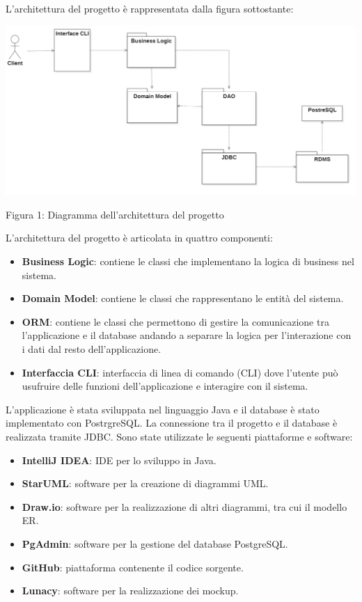 \documentclass[10pt]{article}
\begin{document}
L'architettura del progetto è rappresentata dalla figura sottostante: 
\begin{center}
\hspace*{-1cm}
\includegraphics[scale=0.4]{Sp/Architettura}
\par\medskip
Figura 1: Diagramma dell'architettura del progetto
\par\medskip
\end{center}
L'architettura del progetto è articolata in quattro componenti:
\begin{itemize}
	\item \textbf{Business Logic}: contiene le classi che implementano la logica di business nel sistema.
	\item \textbf{Domain Model}: contiene le classi che rappresentano le entità del sistema.
	\item \textbf{ORM}: contiene le classi che permettono di gestire la comunicazione tra l'applicazione e il database andando a separare la logica per l'interazione con i dati dal resto dell'applicazione.
        \item \textbf{Interfaccia CLI}: interfaccia di linea di comando (CLI) dove l'utente può usufruire delle funzioni dell'applicazione e interagire con il sistema.
\end{itemize}
L'applicazione è stata sviluppata nel linguaggio Java e il database è stato implementato con PostrgreSQL. La connessione tra il progetto e il database è realizzata tramite JDBC. Sono state utilizzate le seguenti piattaforme e software:
\begin{itemize}
\item \textbf{IntelliJ IDEA}: IDE per lo sviluppo in Java.
\item \textbf{StarUML}: software per la creazione di diagrammi UML.
\item \textbf{Draw.io}: software per la realizzazione di altri diagrammi, tra cui il modello ER.
\item \textbf{PgAdmin}: software per la gestione del database PostgreSQL.
\item \textbf{GitHub}: piattaforma contenente il codice sorgente.
\item \textbf{Lunacy}: software per la realizzazione dei mockup.
\end{itemize}
\end{document}
